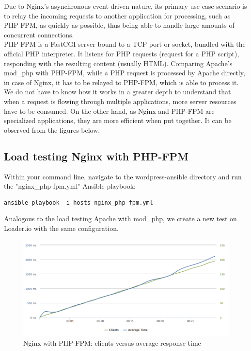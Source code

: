 Due to Nginx's asynchronous event-driven nature, its primary use case scenario is to relay the incoming requests to another application for processing, such as PHP-FPM, as quickly as possible, thus being able to handle large amounts of concurrent connections. \\

PHP-FPM is a FastCGI server bound to a TCP port or socket, bundled with the official PHP interpreter. It listens for PHP requests (request for a PHP script), responding with the resulting content (usually HTML). Comparing Apache's mod\_php with PHP-FPM, while a PHP request is processed by Apache directly, in case of Nginx, it has to be relayed to PHP-FPM, which is able to process it. We do not have to know how it works in a greater depth to understand that when a request is flowing through multiple applications, more \gls{server resources} have to be consumed. On the other hand, as Nginx and PHP-FPM are specialized applications, they are more efficient when put together. It can be observed from the figures below.

\subsection{Load testing Nginx with PHP-FPM}

Within your command line, navigate to the wordpress-ansible directory and run the "nginx\_php-fpm.yml" Ansible playbook:

\begin{lstlisting}
ansible-playbook -i hosts nginx_php-fpm.yml
\end{lstlisting}

Analogous to the load testing Apache with mod\_php, we create a new test on Loader.io with the same configuration. \cite{Loader.io:nginx_php-fpm}

\begin{figure}[H]
\begin{center}
\includegraphics[scale=0.5]{figures/Nginx_PHP-FPM.png}
\caption{Nginx with PHP-FPM: clients versus average response time}
\label{fig:nginx_php-fpm}
\end{center}
\end{figure}

